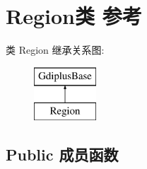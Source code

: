 \hypertarget{class_region}{}\section{Region类 参考}
\label{class_region}
类 Region 继承关系图\+:\begin{figure}[H]
\begin{center}
\leavevmode
\includegraphics[height=2.000000cm]{class_region}
\end{center}
\end{figure}
\subsection*{Public 成员函数}
